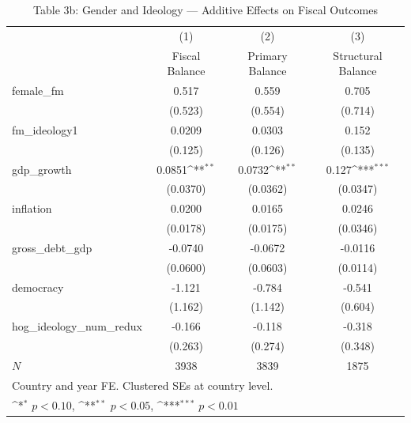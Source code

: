 \begin{table}[htbp]\centering
\def\sym#1{\ifmmode^{#1}\else\(^{#1}\)\fi}
\caption{Table 3b: Gender and Ideology — Additive Effects on Fiscal Outcomes}
\begin{tabular}{l*{3}{c}}
\hline\hline
            &\multicolumn{1}{c}{(1)}&\multicolumn{1}{c}{(2)}&\multicolumn{1}{c}{(3)}\\
            &\multicolumn{1}{c}{Fiscal Balance}&\multicolumn{1}{c}{Primary Balance}&\multicolumn{1}{c}{Structural Balance}\\
\hline
female\_fm   &       0.517         &       0.559         &       0.705         \\
            &     (0.523)         &     (0.554)         &     (0.714)         \\
[1em]
fm\_ideology1&      0.0209         &      0.0303         &       0.152         \\
            &     (0.125)         &     (0.126)         &     (0.135)         \\
[1em]
gdp\_growth  &      0.0851\sym{**} &      0.0732\sym{**} &       0.127\sym{***}\\
            &    (0.0370)         &    (0.0362)         &    (0.0347)         \\
[1em]
inflation   &      0.0200         &      0.0165         &      0.0246         \\
            &    (0.0178)         &    (0.0175)         &    (0.0346)         \\
[1em]
gross\_debt\_gdp&     -0.0740         &     -0.0672         &     -0.0116         \\
            &    (0.0600)         &    (0.0603)         &    (0.0114)         \\
[1em]
democracy   &      -1.121         &      -0.784         &      -0.541         \\
            &     (1.162)         &     (1.142)         &     (0.604)         \\
[1em]
hog\_ideology\_num\_redux&      -0.166         &      -0.118         &      -0.318         \\
            &     (0.263)         &     (0.274)         &     (0.348)         \\
\hline
\(N\)       &        3938         &        3839         &        1875         \\
\hline\hline
\multicolumn{4}{l}{\footnotesize Country and year FE. Clustered SEs at country level.}\\
\multicolumn{4}{l}{\footnotesize \sym{*} \(p<0.10\), \sym{**} \(p<0.05\), \sym{***} \(p<0.01\)}\\
\end{tabular}
\end{table}
